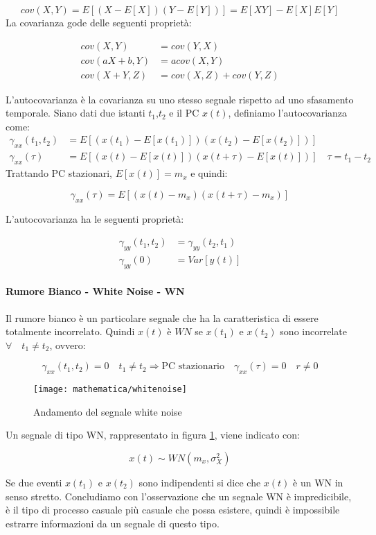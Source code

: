   \[ cov(X,Y)=E\left[(X-E[X])(Y-E[Y])\right]=E[XY]-E[X]E[Y] \]
La covarianza gode delle seguenti proprietà:

  \begin{align*}
    cov(X,Y)&=cov(Y,X)\\
    cov(aX+b,Y)&=acov(X,Y)\\
    cov(X+Y,Z)&=cov(X,Z)+cov(Y,Z)
  \end{align*}

L'autocovarianza è la covarianza su uno stesso segnale rispetto ad uno sfasamento temporale. Siano dati due istanti $t_1$,$t_2$ e il PC $x(t)$, definiamo l'autocovarianza come:
  \begin{align*}
    \gamma_{xx}(t_1,t_2)&=E\left[(x(t_1)-E[x(t_1)])(x(t_2)-E[x(t_2)])\right]\\
       \gamma_{xx}(\tau)&=E[(x(t)-E[x(t)])(x(t+\tau)-E[x(t)])] \quad \tau=t_1-t_2
  \end{align*}
Trattando PC stazionari, $E[x(t)]=m_x$ e quindi:

  \[ \gamma_{xx}(\tau)=E[(x(t)-m_x)(x(t+\tau)-m_x)] \]

\noindent L'autocovarianza ha le seguenti proprietà:

  \begin{align*}
    \gamma_{yy}(t_1,t_2)&=\gamma_{yy}(t_2,t_1)\\
          \gamma_{yy}(0)&=Var[y(t)]
  \end{align*}
        
\paragraph{Rumore Bianco - White Noise - WN}
Il rumore bianco è un particolare segnale che ha la caratteristica di essere totalmente incorrelato. Quindi $x(t)$ è $WN$ se $x(t_1)$ e $x(t_2)$ sono incorrelate $\forall \quad t_1\neq t_2$, ovvero: 

\[ \gamma_{xx}(t_1,t_2)=0 \quad t_1 \neq t_2 \Longrightarrow \text{PC stazionario}\quad \gamma_{xx}(\tau)=0 \quad r\neq 0 \]

\begin{figure}[htbp]
  \centering
  \texttt{[image: mathematica/whitenoise]}
  \caption{Andamento del segnale white noise\label{fig:WN}}
\end{figure}

\noindent Un segnale di tipo WN, rappresentato in figura \ref{fig:WN}, viene indicato con:

\[x(t)\sim WN(m_x,\sigma_X^2) \]

Se due eventi $x(t_1)$ e $x(t_2)$ sono indipendenti si dice che $x(t)$ è un WN in senso stretto. Concludiamo con l'osservazione che un segnale WN è impredicibile, è il tipo di processo casuale più casuale che possa esistere, quindi è impossibile estrarre informazioni da un segnale di questo tipo.
